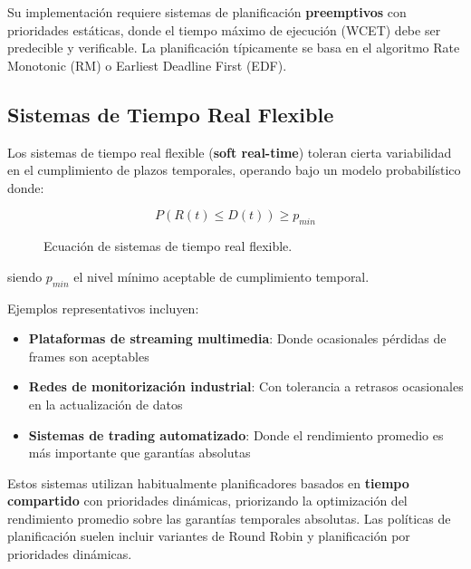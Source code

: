     Su implementación requiere sistemas de planificación \textbf{preemptivos} con prioridades estáticas, donde el tiempo máximo de ejecución (WCET) debe ser predecible y verificable. La planificación típicamente se basa en el algoritmo Rate Monotonic (RM) o Earliest Deadline First (EDF).

    \newpage
    \subsection{Sistemas de Tiempo Real Flexible}
        Los sistemas de tiempo real flexible (\textbf{soft real-time}) toleran cierta variabilidad en el cumplimiento de plazos temporales, operando bajo un modelo probabilístico donde:

  

        \begin{figure}[h!]
            \centering
            \begin{equation}
                P(R(t) \leq D(t)) \geq p_{min}
            \end{equation}            \caption{Ecuación de sistemas de tiempo real flexible.}
            \label{fig:soft_real_time_equation}
        \end{figure}

        siendo $p_{min}$ el nivel mínimo aceptable de cumplimiento temporal.

        Ejemplos representativos incluyen:
        \begin{itemize}
            \item \textbf{Plataformas de streaming multimedia}: Donde ocasionales pérdidas de frames son aceptables
            \item \textbf{Redes de monitorización industrial}: Con tolerancia a retrasos ocasionales en la actualización de datos
            \item \textbf{Sistemas de trading automatizado}: Donde el rendimiento promedio es más importante que garantías absolutas
        \end{itemize}

        Estos sistemas utilizan habitualmente planificadores basados en \textbf{tiempo compartido} con prioridades dinámicas, priorizando la optimización del rendimiento promedio sobre las garantías temporales absolutas. Las políticas de planificación suelen incluir variantes de Round Robin y planificación por prioridades dinámicas.

